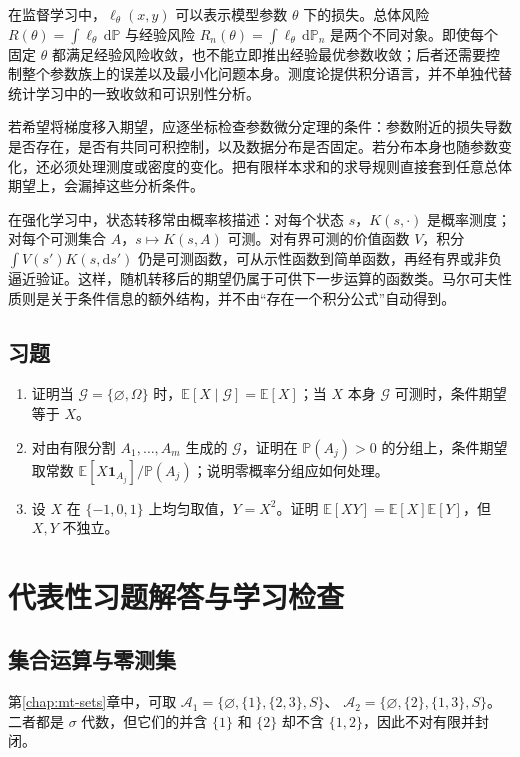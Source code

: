 \documentclass[UTF8,12pt,a4paper,fontset=fandol]{ctexbook}
\begin{document}
在监督学习中，$\ell_\theta(x,y)$ 可以表示模型参数 $\theta$ 下的损失。总体风险
$R(\theta)=\int\ell_\theta\,\mathrm d\mathbb P$
与经验风险
$R_n(\theta)=\int\ell_\theta\,\mathrm d\mathbb P_n$
是两个不同对象。即使每个固定 $\theta$ 都满足经验风险收敛，也不能立即推出经验最优参数收敛；后者还需要控制整个参数族上的误差以及最小化问题本身。测度论提供积分语言，并不单独代替统计学习中的一致收敛和可识别性分析。

若希望将梯度移入期望，应逐坐标检查参数微分定理的条件：参数附近的损失导数是否存在，是否有共同可积控制，以及数据分布是否固定。若分布本身也随参数变化，还必须处理测度或密度的变化。把有限样本求和的求导规则直接套到任意总体期望上，会漏掉这些分析条件。

在强化学习中，状态转移常由概率核描述：对每个状态 $s$，$K(s,\cdot)$ 是概率测度；对每个可测集合 $A$，$s\mapsto K(s,A)$ 可测。对有界可测的价值函数 $V$，积分 $\int V(s')K(s,\mathrm ds')$ 仍是可测函数，可从示性函数到简单函数，再经有界或非负逼近验证。这样，随机转移后的期望仍属于可供下一步运算的函数类。马尔可夫性质则是关于条件信息的额外结构，并不由“存在一个积分公式”自动得到。

\section{习题}
\begin{enumerate}
 \item 证明当 $\mathcal G=\{\varnothing,\Omega\}$ 时，$\mathbb E[X\mid\mathcal G]=\mathbb E[X]$；当 $X$ 本身 $\mathcal G$ 可测时，条件期望等于 $X$。
 \item 对由有限分割 $A_1,\ldots,A_m$ 生成的 $\mathcal G$，证明在 $\mathbb P(A_j)>0$ 的分组上，条件期望取常数 $\mathbb E[X\mathbf1_{A_j}]/\mathbb P(A_j)$；说明零概率分组应如何处理。
 \item 设 $X$ 在 $\{-1,0,1\}$ 上均匀取值，$Y=X^2$。证明 $\mathbb E[XY]=\mathbb E[X]\mathbb E[Y]$，但 $X,Y$ 不独立。
\end{enumerate}

\appendix
\chapter{代表性习题解答与学习检查}
\label{app:mt-exercises}

\section{集合运算与零测集}
第\ref{chap:mt-sets}章中，可取
$\mathcal A_1=\{\varnothing,\{1\},\{2,3\},S\}$、
$\mathcal A_2=\{\varnothing,\{2\},\{1,3\},S\}$。
二者都是 $\sigma$ 代数，但它们的并含 $\{1\}$ 和 $\{2\}$ 却不含 $\{1,2\}$，因此不对有限并封闭。
\end{document}
